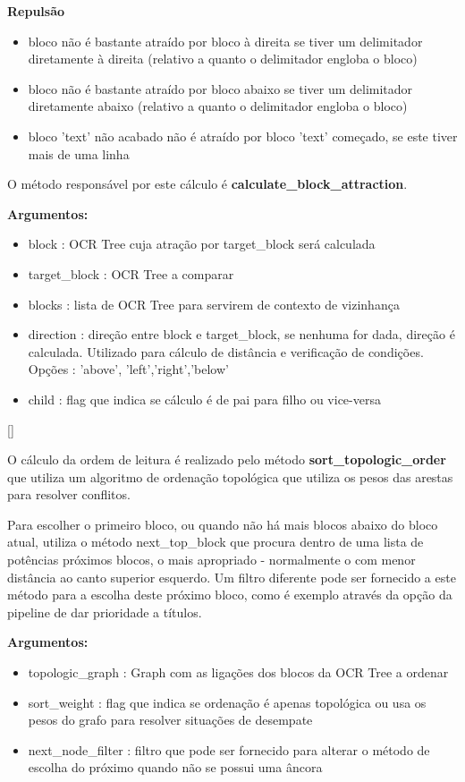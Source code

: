 \textbf{Repulsão}
\begin{itemize}\setlength\itemsep{-0.8em}
	\item bloco não é bastante atraído por bloco à direita se tiver um delimitador diretamente à direita (relativo a quanto o delimitador engloba o bloco)
	\item bloco não é bastante atraído por bloco abaixo se tiver um delimitador diretamente abaixo (relativo a quanto o delimitador engloba o bloco)
	\item bloco 'text' não acabado não é atraído por bloco 'text' começado, se este tiver mais de uma linha 
\end{itemize}

O método responsável por este cálculo é \textbf{calculate\_block\_attraction}.

\textbf{Argumentos:}
\begin{itemize}\setlength\itemsep{-0.3em}
	\item block : OCR Tree cuja atração por target\_block será calculada
	\item target\_block : OCR Tree a comparar
	\item blocks : lista de OCR Tree para servirem de contexto de vizinhança
	\item direction : direção entre block e target\_block, se nenhuma for dada, direção é calculada. Utilizado para cálculo de distância e verificação de condições. Opções : 'above', 'left','right','below'
	\item child : flag que indica se cálculo é de pai para filho ou vice-versa
\end{itemize}



[\normalsize]

O cálculo da ordem de leitura é realizado pelo método \textbf{sort\_topologic\_order} que utiliza um algoritmo de ordenação topológica que utiliza os pesos das arestas para resolver conflitos.

Para escolher o primeiro bloco, ou quando não há mais blocos abaixo do bloco atual, utiliza o método next\_top\_block que procura dentro de uma lista de potências próximos blocos, o mais apropriado - normalmente o com menor distância ao canto superior esquerdo. Um filtro diferente pode ser fornecido a este método para a escolha deste próximo bloco, como é exemplo através da opção da pipeline de dar prioridade a títulos.

\textbf{Argumentos:}
\begin{itemize}\setlength\itemsep{-0.3em}
	\item topologic\_graph : Graph com as ligações dos blocos da OCR Tree a ordenar
	\item sort\_weight : flag que indica se ordenação é apenas topológica ou usa os pesos do grafo para resolver situações de desempate
	\item next\_node\_filter : filtro que pode ser fornecido para alterar o método de escolha do próximo quando não se possui uma âncora
\end{itemize}

